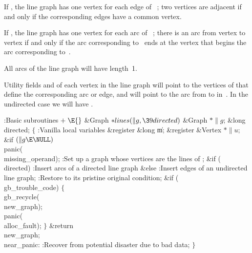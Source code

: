 If , the line graph has one vertex for each edge of~%
;
two vertices are adjacent if and only if the corresponding edges
have a common vertex.

If , the line graph has one vertex for each arc of~%
;
there is an arc from vertex  to vertex  if and only if the
arc corresponding to~ ends at the vertex that begins the arc
corresponding to~.

All arcs of the line graph will have length~1.

Utility fields  and  of each vertex in the line
graph will point to
the vertices of  that define the corresponding arc or edge, and  will
point to the arc from  to  in~. In the
undirected case we will
have .

\Y\B\4:Basic subroutines\X${}\mathrel+\E{}$\6
\&{Graph} ${}{*}\\{lines}(\|g,\39\\{directed}){}$\1\1\6
\&{Graph} ${}{*}\|g{}$;\6
\&{long} \\{directed};\2\2\6
${}\{{}$\5
\1:Vanilla local variables\X\5
\hbox{}\6{}\&{register} \&{long} \|m;\6
\&{register} \&{Vertex} ${}{*}\|u;{}$\7
\&{if} ${}(\|g\E\NULL){}$\1\5
\\{panic}(\\{missing\_operand});\2\6
:Set up a graph whose vertices are the lines of \X;\6
\&{if} (\\{directed})\1\5
:Insert arcs of a directed line graph\X\2\6
\&{else}\1\5
:Insert edges of an undirected line graph\X;\2\6
:Restore  to its pristine original condition\X;\6
\&{if} (\\{gb\_trouble\_code})\5
${}\{{}$\1\6
\\{gb\_recycle}(\\{new\_graph});\6
\\{panic}(\\{alloc\_fault});\6
\4${}\}{}$\2\6
\&{return} \\{new\_graph};\6
\4\\{near\_panic}:\5
:Recover from potential disaster due to bad data\X;\6
\4${}\}{}$\2\par
\fi

